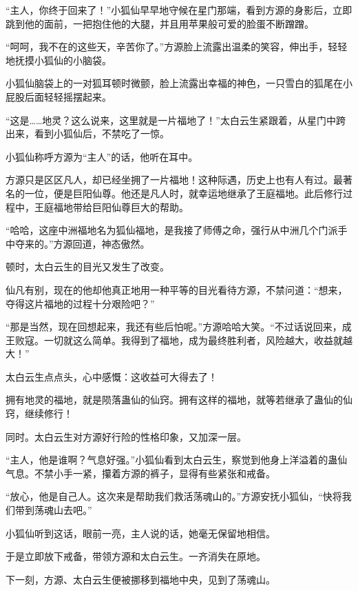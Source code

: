 
\begin{this_body}



“主人，你终于回来了！”小狐仙早早地守候在星门那端，看到方源的身影后，立即跳到他的面前，一把抱住他的大腿，并且用苹果般可爱的脸蛋不断蹭蹭。

“呵呵，我不在的这些天，辛苦你了。”方源脸上流露出温柔的笑容，伸出手，轻轻地抚摸小狐仙的小脑袋。

小狐仙脑袋上的一对狐耳顿时微颤，脸上流露出幸福的神色，一只雪白的狐尾在小屁股后面轻轻摇摆起来。

“这是……地灵？这么说来，这里就是一片福地了！”太白云生紧跟着，从星门中跨出来，看到小狐仙后，不禁吃了一惊。

小狐仙称呼方源为“主人”的话，他听在耳中。

方源只是区区凡人，却已经坐拥了一片福地！这种际遇，历史上也有人有过。最著名的一位，便是巨阳仙尊。他还是凡人时，就幸运地继承了王庭福地。此后修行过程中，王庭福地带给巨阳仙尊巨大的帮助。

“哈哈，这座中洲福地名为狐仙福地，是我接了师傅之命，强行从中洲几个门派手中夺来的。”方源回道，神态傲然。

顿时，太白云生的目光又发生了改变。

仙凡有别，现在的他却他真正地用一种平等的目光看待方源，不禁问道：“想来，夺得这片福地的过程十分艰险吧？”

“那是当然，现在回想起来，我还有些后怕呢。”方源哈哈大笑。“不过话说回来，成王败寇。一切就这么简单。我得到了福地，成为最终胜利者，风险越大，收益就越大！”

太白云生点点头，心中感慨：这收益可大得去了！

拥有地灵的福地，就是陨落蛊仙的仙窍。拥有这样的福地，就等若继承了蛊仙的仙窍，继续修行！

同时。太白云生对方源好行险的性格印象，又加深一层。

“主人，他是谁啊？气息好强。”小狐仙看到太白云生，察觉到他身上洋溢着的蛊仙气息。不禁小手一紧，攥着方源的裤子，显得有些紧张和戒备。

“放心，他是自己人。这次来是帮助我们救活荡魂山的。”方源安抚小狐仙，“快将我们带到荡魂山去吧。”

小狐仙听到这话，眼前一亮，主人说的话，她毫无保留地相信。

于是立即放下戒备，带领方源和太白云生。一齐消失在原地。

下一刻，方源、太白云生便被挪移到福地中央，见到了荡魂山。


\end{this_body}
